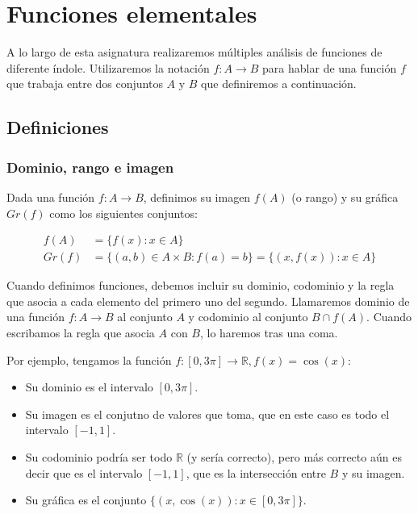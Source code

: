 \chapter{Funciones elementales}\label{funciones-elementales}

A lo largo de esta asignatura realizaremos múltiples análisis de funciones de diferente índole.
Utilizaremos la notación $f : A \rightarrow B$ para hablar de una función $f$ que trabaja entre dos conjuntos $A$ y $B$ que definiremos a continuación.

\section{Definiciones}

\subsection{Dominio, rango e imagen}

Dada una función $f : A \rightarrow B$, definimos su imagen $f(A)$ (o rango) y su gráfica $Gr(f)$ como los siguientes conjuntos:

\begin{align*}
	f(A)  & = \{f(x) : x \in A\} \\
	Gr(f) & = \{(a,b) \in A \times B : f(a) = b\} = \{(x, f(x)) : x \in A\}
\end{align*}


Cuando definimos funciones, debemos incluir su dominio, codominio y la regla que asocia a cada elemento del primero uno del segundo.
Llamaremos dominio de una función $f : A \rightarrow B$ al conjunto $A$ y codominio al conjunto $B \cap f(A)$.
Cuando escribamos la regla que asocia $A$ con $B$, lo haremos tras una coma.

Por ejemplo, tengamos la función $f : [0,3\pi] \rightarrow \mathbb{R}, f(x) = \cos(x)$:

\begin{itemize}
	\item Su dominio es el intervalo $[0,3\pi]$.
	\item Su imagen es el conjutno de valores que toma, que en este caso es todo el intervalo $[-1,1]$.
	\item Su codominio podría ser todo $\mathbb{R}$ (y sería correcto), pero más correcto aún es decir que es el intervalo $[-1,1]$, que es la intersección entre $B$ y su imagen.
	\item Su gráfica es el conjunto $\{(x,\cos(x)) : x \in [0,3\pi]\}$.
\end{itemize}

